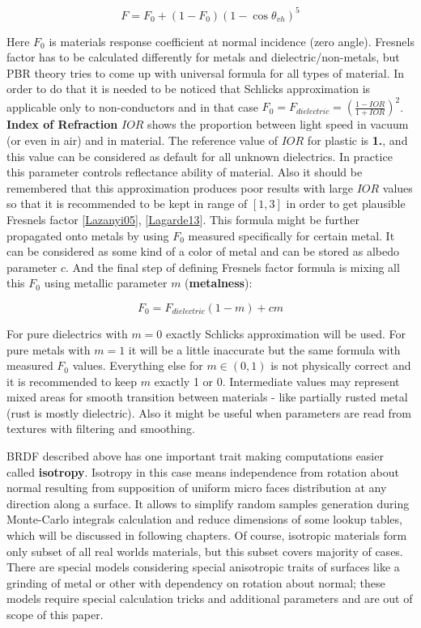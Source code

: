 \[F=F_0+(1-F_0)(1-\cos\theta_{vh})^5\]

Here $F_0$ is material\textquotesingle{}s response coefficient at normal incidence (zero angle). Fresnel\textquotesingle{}s factor has to be calculated differently for metals and dielectric/non-\/metals, but P\+BR theory tries to come up with universal formula for all types of material. In order to do that it is needed to be noticed that Schlick\textquotesingle{}s approximation is applicable only to non-\/conductors and in that case $F_0 = F_{dielectric} = \left(\frac{1-IOR}{1+IOR}\right)^2$. {\bfseries Index of Refraction} $IOR$ shows the proportion between light speed in vacuum (or even in air) and in material. The reference value of $IOR$ for plastic is {\bfseries 1.}, and this value can be considered as default for all unknown dielectrics. In practice this parameter controls reflectance ability of material. Also it should be remembered that this approximation produces poor results with large $IOR$ values so that it is recommended to be kept in range of $[1, 3]$ in order to get plausible Fresnel\textquotesingle{}s factor \mbox{[}\hyperlink{specification__pbr_math_Lazanyi05}{Lazanyi05}\mbox{]}, \mbox{[}\hyperlink{specification__pbr_math_Lagarde13}{Lagarde13}\mbox{]}. This formula might be further propagated onto metals by using $F_0$ measured specifically for certain metal. It can be considered as some kind of a \textquotesingle{}color\textquotesingle{} of metal and can be stored as albedo parameter $c$. And the final step of defining Fresnel\textquotesingle{}s factor formula is mixing all this $F_0$ using metallic parameter $m$ ({\bfseries metalness})\+:

\[F_0 = F_{dielectric}(1-m)+cm\]

For pure dielectrics with $m=0$ exactly Schlick\textquotesingle{}s approximation will be used. For pure metals with $m=1$ it will be a little inaccurate but the same formula with measured $F_0$ values. Everything else for $m \in (0, 1)$ is not physically correct and it is recommended to keep $m$ exactly 1 or 0. Intermediate values may represent mixed areas for smooth transition between materials -\/ like partially rusted metal (rust is mostly dielectric). Also it might be useful when parameters are read from textures with filtering and smoothing.

B\+R\+DF described above has one important trait making computations easier called {\bfseries isotropy}. Isotropy in this case means independence from rotation about normal resulting from supposition of uniform micro faces distribution at any direction along a surface. It allows to simplify random samples generation during Monte-\/\+Carlo integrals calculation and reduce dimensions of some lookup tables, which will be discussed in following chapters. Of course, isotropic materials form only subset of all real world\textquotesingle{}s materials, but this subset covers majority of cases. There are special models considering special anisotropic traits of surfaces like a grinding of metal or other with dependency on rotation about normal; these models require special calculation tricks and additional parameters and are out of scope of this paper.

